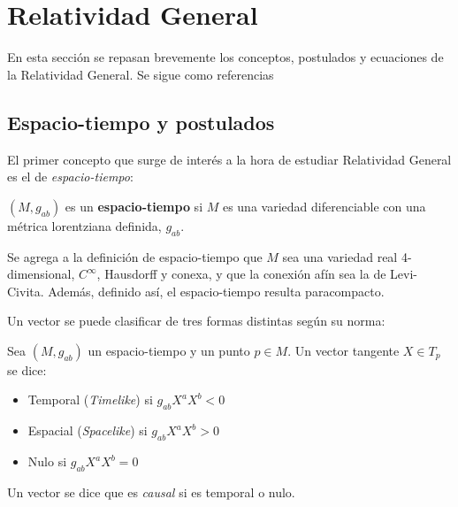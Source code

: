       
   


\section{Relatividad General}

En esta sección se repasan brevemente los conceptos, postulados y ecuaciones de la Relatividad General. Se sigue como referencias \citep{1984ucp..book.....W,1975lsss.book.....H,2009fcgr.book.....S} 



\subsection{Espacio-tiempo y postulados}

El primer concepto que surge de interés a la hora de estudiar Relatividad General es el de \textit{espacio-tiempo}:

\begin{definition}
$(M,g_{ab})$ es un \textbf{espacio-tiempo} si $M$ es una variedad diferenciable con una métrica lorentziana definida, $g_{ab}$.
\end{definition}


Se agrega a la definición de espacio-tiempo que $M$ sea una variedad real 4-dimensional, $C^\infty$, Hausdorff y conexa, y que la conexión afín sea la de Levi-Civita. Además, definido así, el espacio-tiempo resulta paracompacto.

Un vector se puede clasificar de tres formas distintas según su norma:

\begin{definition}
Sea $(M,g_{ab})$ un espacio-tiempo y un punto $p\in M$. Un vector tangente $X\in T_p$ se dice:
    \begin{itemize}
        \item Temporal (\textit{Timelike}) \qquad si  $g_{ab}X^aX^b<0$
        \item Espacial (\textit{Spacelike}) \hspace{0.8cm} si  $g_{ab}X^aX^b>0$
        \item Nulo      \hspace{3.3cm} si  $g_{ab}X^aX^b=0$
    \end{itemize}
Un vector se dice que es \textit{causal} si es temporal o nulo.
\end{definition}

